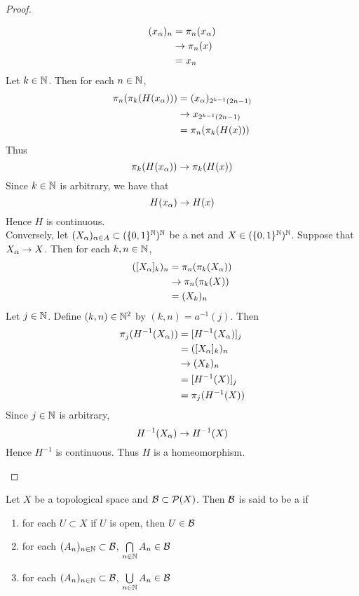 \documentclass{book}
\begin{document}
\begin{proof}
\begin{enumerate}
			\begin{align*}
				(x_{\alpha})_n
				& = \pi_n(x_{\alpha}) \\
				& \rightarrow \pi_n(x) \\
				& = x_n 
			\end{align*}
			Let $k \in \mathbb{N}$. Then for each $n \in \mathbb{N}$,
			\begin{align*}
				\pi_{n}(\pi_k(H(x_{\alpha})))
				& = (x_{\alpha})_{ 2^{k-1}(2n -1)} \\
				& \rightarrow x_{2^{k-1}(2n -1)} \\
				& = \pi_n(\pi_k(H(x)))
			\end{align*}
			Thus 
			$$\pi_k(H(x_{\alpha})) \rightarrow \pi_k(H(x))$$
			Since $k \in \mathbb{N}$ is arbitrary, we have that 
			$$H(x_{\alpha}) \rightarrow H(x)$$
			Hence $H$ is continuous. \\
			Conversely, let $(X_{\alpha})_{\alpha \in A} \subset (\{0,1\}^{\mathbb{N}})^{\mathbb{N}}$ be a net and $X \in (\{0,1\}^{\mathbb{N}})^{\mathbb{N}}$. Suppose that $X_{\alpha} \rightarrow X$. Then for each $k, n \in \mathbb{N}$, 
			\begin{align*}
				([X_{\alpha}]_k)_n  
				& = \pi_n(\pi_k(X_{\alpha})) \\
				& \rightarrow \pi_n(\pi_k(X)) \\ 
				& = (X_k)_n
			\end{align*}
			Let $j \in \mathbb{N}$. Define $(k,n) \in \mathbb{N}^2$ by $(k,n) = a^{-1}(j)$. Then 
			\begin{align*}
				\pi_j(H^{-1}(X_{\alpha}))
				& = [H^{-1}(X_{\alpha})]_j \\
				& = ([X_{\alpha}]_k)_n \\
				& \rightarrow (X_k)_n \\
				& = [H^{-1}(X)]_j \\
				& = \pi_j(H^{-1}(X))
			\end{align*}
			Since $j \in \mathbb{N}$ is arbitrary, 
			$$H^{-1}(X_{\alpha}) \rightarrow H^{-1}(X)$$
			Hence $H^{-1}$ is continuous. Thus $H$ is a homeomorphism.
		\end{enumerate}
	\end{proof}

	
	
	\begin{defn}
		Let $X$ be a topological space and $\mathcal{B} \subset \mathcal{P}(X)$. Then $\mathcal{B}$ is said to be a  if 
		\begin{enumerate}
			\item for each $U \subset X$ if $U$ is open, then $U \in \mathcal{B}$ 
			\item for each $(A_n)_{n \in \mathbb{N}} \subset \mathcal{B}$, $\bigcap\limits_{n \in \mathbb{N}} A_n \in \mathcal{B}$
			\item for each $(A_n)_{n \in \mathbb{N}} \subset \mathcal{B}$, $\bigcup\limits_{n \in \mathbb{N}} A_n \in \mathcal{B}$
		\end{enumerate}
	\end{defn}
	
\end{document}

